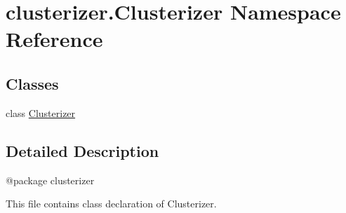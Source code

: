 \hypertarget{namespaceclusterizer_1_1Clusterizer}{}\section{clusterizer.\+Clusterizer Namespace Reference}
\label{namespaceclusterizer_1_1Clusterizer}
\subsection*{Classes}
\begin{DoxyCompactItemize}
\item 
class \hyperlink{classclusterizer_1_1Clusterizer_1_1Clusterizer}{Clusterizer}
\end{DoxyCompactItemize}


\subsection{Detailed Description}
\begin{DoxyVerb}@package clusterizer

This file contains class declaration of Clusterizer.
\end{DoxyVerb}
 
